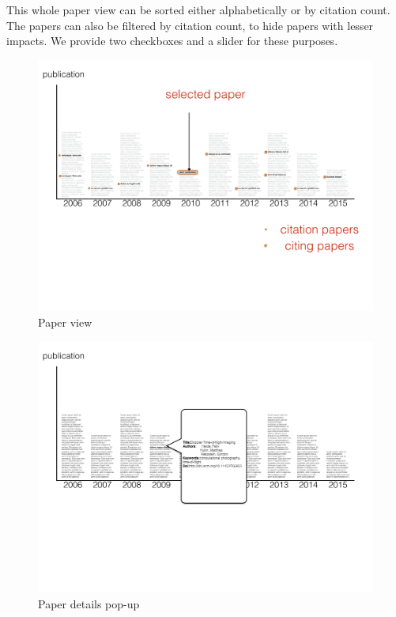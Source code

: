 \documentclass[12pt]{article}
\begin{document}
This whole paper view can be sorted either alphabetically or by citation count. The papers can also be filtered by citation count, to hide papers with lesser impacts. We provide two checkboxes and a slider for these purposes.

\begin{figure}[htb!]
    \centering
    \includegraphics[width=160mm]{visproposalDrawing_page_Part_2.pdf}
    \caption{Paper view}
    \label{fig:paper_view}
\end{figure}

\begin{figure}[htb!]
    \centering
    \includegraphics[width=160mm]{visproposalDrawing_page_Part_8.pdf}
    \caption{Paper details pop-up}
    \label{fig:pop-up}
\end{figure}
\end{document}
